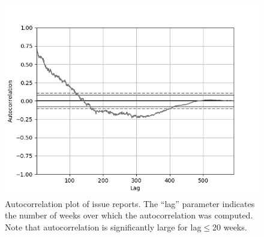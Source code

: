 \begin{figure}[t!]
	\centering
	\includegraphics[width=\linewidth]{images/sample/sample_autocorr.png}
	\caption{Autocorrelation plot of issue reports. The ``lag'' parameter 
	indicates the number of weeks over which the autocorrelation was computed. 
	Note that autocorrelation is significantly large for lag$\leq$20 weeks.}
	\label{fig:autocorr}
\end{figure}
